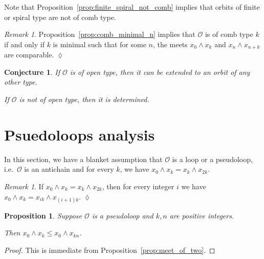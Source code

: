 \documentclass[final,a4paper,12pt,reqno]{amsart}
\newcommand{\meet}{\mathop{\wedge}}
\newtheorem{conj}[thm]{Conjecture}
\newtheorem{prop}[thm]{Proposition}
\theoremstyle{remark}
\newtheorem{rem}[thm]{Remark}
\theoremstyle{definition}
\newcommand{\xqed}[1]{%
	\leavevmode\unskip\penalty9999 \hbox{}\nobreak\hfill
	\quad\hbox{\ensuremath{#1}}}
\let \leq \leqslant
\begin{document}
	
	Note that Proposition~\ref{prop:finite_spiral_not_comb} implies that orbits of finite or spiral type are not of comb type.
	
	\begin{rem}
		Proposition~\ref{prop:comb_minimal_n} implies that $\mathcal O$ is of comb type $k$ if and only if $k$ is minimal such that for some $n$, the meets $x_0\meet x_k$ and $x_{n}\meet x_{n+k}$ are comparable.\xqed{\lozenge}
	\end{rem}
	
	\begin{conj}
		If $\mathcal O$ is of open type, then it can be extended to an orbit of any other type.
		
		If $\mathcal O$ is not of open type, then it is determined.
	\end{conj}
	
	\section{Psuedoloops analysis}
	In this section, we have a blanket assumption that $\mathcal O$ is a loop or a pseudoloop, i.e.\ $\mathcal O$ is an antichain and for every $k$, we have $x_0\meet x_k=x_k\meet x_{2k}$.
	\begin{rem}
		\label{rem:meet_push}
		If $x_0\meet x_k=x_k\meet x_{2k}$, then for every integer $i$ we have $x_0\meet x_k=x_{ik}\meet x_{(i+1)k}$.\xqed{\lozenge}
	\end{rem}
	\begin{prop}
		Suppose $\mathcal O$ is a pseudoloop and $k,n$ are positive integers.
		
		Then $x_0\meet x_k\leq x_0\meet x_{kn}$.
	\end{prop}
	\begin{proof}
		This is immediate from Proposition~\ref{prop:meet_of_two}.
	\end{proof}
	
\end{document}
